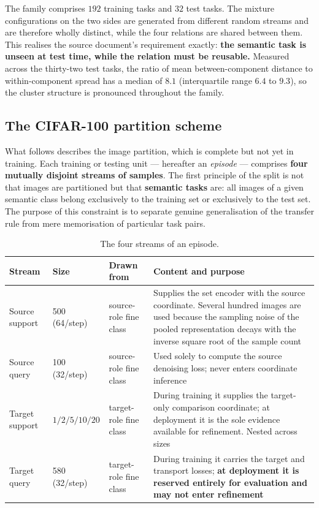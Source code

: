 \documentclass[11pt]{article}
\begin{document}
The family comprises $192$ training tasks and $32$ test tasks. The mixture configurations on the two
sides are generated from different random streams and are therefore wholly distinct, while the four
relations are shared between them. This realises the source document's requirement exactly:
\textbf{the semantic task is unseen at test time, while the relation must be reusable.} Measured
across the thirty-two test tasks, the ratio of mean between-component distance to within-component
spread has a median of $8.1$ (interquartile range $6.4$ to $9.3$), so the cluster structure is
pronounced throughout the family.

\subsection{The CIFAR-100 partition scheme}

What follows describes the image partition, which is complete but not yet in training. Each training
or testing unit --- hereafter an \emph{episode} --- comprises \textbf{four mutually disjoint streams
of samples}. The first principle of the split is not that images are partitioned but that
\textbf{semantic tasks} are: all images of a given semantic class belong exclusively to the training
set or exclusively to the test set. The purpose of this constraint is to separate genuine
generalisation of the transfer rule from mere memorisation of particular task pairs.

\begin{table}[htbp]
\centering\small
\begin{tabular}{@{}p{2.7cm}p{2.1cm}p{2.7cm}p{6.0cm}@{}}
\toprule
\textbf{Stream} & \textbf{Size} & \textbf{Drawn from} & \textbf{Content and purpose} \\
\midrule
Source support & 500 (64/step) & source-role fine class
  & Supplies the set encoder with the source coordinate. Several hundred images are used because the
    sampling noise of the pooled representation decays with the inverse square root of the sample
    count \\[2pt]
Source query & 100 (32/step) & source-role fine class
  & Used solely to compute the source denoising loss; never enters coordinate inference \\[2pt]
Target support & $1/2/5/10/20$ & target-role fine class
  & During training it supplies the target-only comparison coordinate; at deployment it is the sole
    evidence available for refinement. Nested across sizes \\[2pt]
Target query & 580 (32/step) & target-role fine class
  & During training it carries the target and transport losses; \textbf{at deployment it is reserved
    entirely for evaluation and may not enter refinement} \\
\bottomrule
\end{tabular}
\caption{The four streams of an episode.}
\label{tab:streams}
\end{table}
\end{document}
